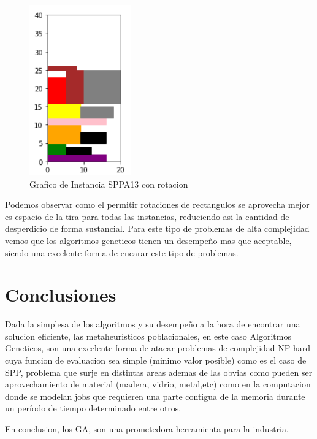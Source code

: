 \documentclass[10pt]{article}
\begin{document}
\begin{figure}[H]
\centerline{\includegraphics[width=0.5\linewidth]{6_con_rotar.jpg}}
\caption{Grafico de Instancia SPPA13 con rotacion }
\label{fig_12}
\end{figure} 

Podemos observar como el permitir rotaciones de rectangulos se aprovecha mejor es espacio de la tira para todas las instancias, reduciendo asi la cantidad de desperdicio de forma sustancial. Para este tipo de problemas de alta complejidad vemos que los algoritmos geneticos tienen un desempeño mas que aceptable, siendo una excelente forma de encarar este tipo de problemas.


\section{Conclusiones}
Dada la simplesa de los algoritmos y su desempeño a la hora de encontrar una solucion eficiente, las metaheuristicos poblacionales, en este caso Algoritmos Geneticos, son una excelente forma de atacar problemas de complejidad NP hard cuya funcion de evaluacion sea simple (minimo valor posible) como es el caso de SPP, problema que surje en distintas areas ademas de las obvias como pueden ser aprovechamiento de material (madera, vidrio, metal,etc) como en la computacion donde se modelan jobs que requieren una parte contigua de la memoria durante un período de tiempo determinado entre otros.

En conclusion, los GA, son una prometedora herramienta para la industria.
\end{document}
